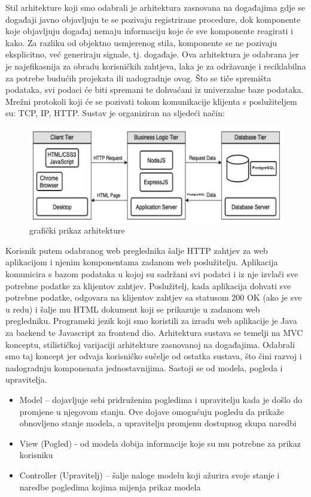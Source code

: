	Stil arhitekture koji smo odabrali je arhitektura zasnovana na događajima gdje se događaji javno objavljuju te se pozivaju registrirane procedure, dok komponente koje objavljuju događaj nemaju informaciju koje će sve komponente reagirati i kako. Za razliku od objektno usmjerenog stila, komponente se ne pozivaju eksplicitno, već generiraju signale, tj. događaje. Ova arhitektura je odabrana jer je najefikasnija za obradu korisničkih zahtjeva, laka je za održavanje i reciklabilna za potrebe budućih projekata ili nadogradnje ovog. Što se tiče spremišta podataka, svi podaci će biti spremani te dohvaćani iz univerzalne baze podataka. Mrežni protokoli koji će se pozivati tokom komunikacije klijenta s poslužiteljem su: TCP, IP, HTTP. 
Sustav je organiziran na sljedeći način: 
\begin{figure}[H]
			\includegraphics[width=\textwidth]{slike/arhitekturaSkica.png} %
			\caption{grafički prikaz arhitekture}
			\label{fig:arhitektura} %
			\end{figure}
Korisnik putem odabranog web preglednika šalje HTTP zahtjev za web aplikacijom i njenim komponentama zadanom web poslužitelju. Aplikacija komunicira s bazom podataka u kojoj su sadržani svi podatci i iz nje izvlači sve potrebne podatke za klijentov zahtjev. Poslužitelj, kada aplikacija dohvati sve potrebne podatke, odgovara na klijentov zahtjev sa statusom 200 OK (ako je sve u redu) i šalje mu HTML dokument koji se prikazuje u zadanom web pregledniku.
Programski jezik koji smo koristili za izradu web aplikacije je Java za backend te Javascript za frontend dio.
Arhitektura sustava se temelji na MVC konceptu, stilističkoj varijaciji arhitekture zasnovanoj na događajima. Odabrali smo taj koncept jer odvaja korisničko sučelje od ostatka sustava, što čini razvoj i nadogradnju komponenata jednostavnijima. Sastoji se od modela, pogleda i upravitelja.
		
\begin{itemize}
\item Model – dojavljuje sebi pridruženim pogledima i upravitelju kada je došlo do promjene u njegovom stanju. Ove dojave omogućuju pogledu da prikaže obnovljeno stanje modela, a upravitelju promjenu dostupnog skupa naredbi
\item View (Pogled) - od modela dobija informacije koje su mu potrebne za prikaz korisniku
\item Controller (Upravitelj)  – šalje naloge modelu koji ažurira svoje stanje i naredbe pogledima kojima mijenja prikaz modela
\end{itemize}
		

